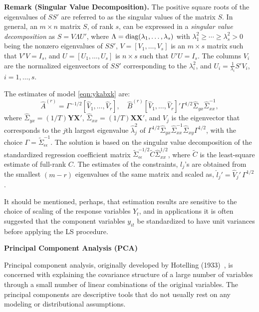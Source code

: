 \noindent\textbf{Remark (Singular Value Decomposition).} The positive square roots of the eigenvalues of $SS'$ are referred to as the singular values of the matrix $S$. In general, an $m \times n$ matrix $S$, of rank $s$, can be expressed in a \emph{singular value decomposition} as $S= V \Lambda U'$, where $\Lambda= \operatorname{diag}(\lambda_1, \ldots, \lambda_s)$ with $\lambda_1^2 \geq \cdots \geq \lambda_s^2 > 0$ being the nonzero eigenvalues of $SS'$, $V= [V_1, \ldots, V_s]$ is an $m \times s$ matrix such that $V' V= I_s$, and $U= [U_1, \ldots, U_s]$ is $n \times s$ such that $U'U= I_s$. The columns $V_i$ are the normalized eigenvectors of $SS'$ corresponding to the $\lambda_i^2$, and $U_i= \frac{1}{\lambda_i}S'V_i$, $i=1, \ldots, s$. \twomedskip


The estimates of model \eqref{eqn:ykabxk} are:
	\begin{equation} \label{eqn:covarmatrixsol}
	\hat{A}^{(r)}= \Gamma^{-1/2} [\hat{V}_1, \ldots, \hat{V}_r], \quad \hat{B}^{(r)}[ \hat{V}_1, \ldots, \hat{V}_r]' \Gamma^{1/2} \hat{\Sigma}_{yx} \hat{\Sigma}_{xx}^{-1},
	\end{equation}
where $\hat{\Sigma}_{yx}= (1/T) \mathbf{Y} \mathbf{X}'$, $\hat{\Sigma}_{xx}= (1/T) \mathbf{X} \mathbf{X}'$, and $\hat{V}_j$ is the eigenvector that corresponds to the $j$th largest eigenvalue $\hat{\lambda}_j^2$ of $\Gamma^{1/2} \hat{\Sigma}_{yx} \hat{\Sigma}_{xx}^{-1} \hat{\Sigma}_{xy}\Gamma^{1/2}$, with the choice $\Gamma= \tilde{\Sigma}_{\epsilon\epsilon}^{-1}$. The solution is based on the singular value decomposition of the standardized regression coefficient matrix $\tilde{\Sigma}_{\epsilon\epsilon}^{-1/2} \tilde{C} \hat{\Sigma}_{xx}^{1/2}$, where $\tilde{C}$ is the least-square estimate of full-rank $C$. The estimates of the constraints, $l_j$'s are obtained from the smallest $(m-r)$ eigenvalues of the same matrix and scaled as, $\hat{l}_j' = \hat{V}_j' \, \Gamma^{1/2}$. 


It should be mentioned, perhaps, that estimation results are sensitive to the choice of scaling of the response variables $Y_t$, and in applications it is often suggested that the component variables $y_{it}$ be standardized to have unit variances before applying the LS procedure. \twomedskip


\noindent\textbf{Principal Component Analysis (PCA)} \twomedskip


Principal component analysis, originally developed by Hotelling (1933)~\cite{hotelling33}, is concerned with explaining the covariance structure of a large number of variables through a small number of linear combinations of the original variables. The principal components are descriptive tools that do not usually rest on any modeling or distributional assumptions. 


